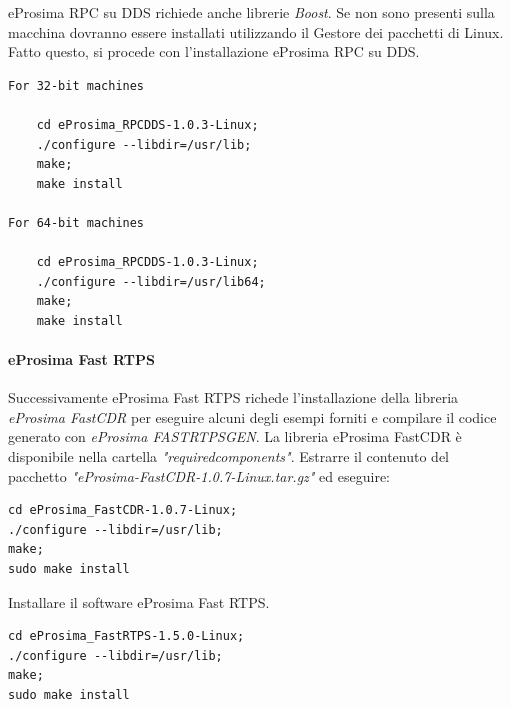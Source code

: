 \documentclass[a4paper]{article}
\begin{document}
eProsima RPC su DDS richiede anche librerie \textit{Boost}. Se non sono presenti sulla macchina dovranno essere installati utilizzando il  Gestore dei pacchetti di Linux. Fatto questo, si procede con l'installazione  eProsima RPC su DDS.

\begin{verbatim}
For 32-bit machines

    cd eProsima_RPCDDS-1.0.3-Linux;
    ./configure --libdir=/usr/lib;
    make;
    make install

For 64-bit machines

    cd eProsima_RPCDDS-1.0.3-Linux;
    ./configure --libdir=/usr/lib64;
    make;
    make install
\end{verbatim}

\paragraph{eProsima Fast RTPS}
Successivamente eProsima Fast RTPS richede l'installazione della libreria \textit{eProsima FastCDR} per eseguire alcuni degli esempi forniti e compilare il codice generato con \textit{eProsima FASTRTPSGEN}.
La libreria eProsima FastCDR è disponibile nella cartella \textit{"requiredcomponents"}. Estrarre il contenuto del pacchetto \textit{"eProsima-FastCDR-1.0.7-Linux.tar.gz"} ed eseguire:
\begin{verbatim}
cd eProsima_FastCDR-1.0.7-Linux;
./configure --libdir=/usr/lib;
make;
sudo make install
\end{verbatim}
Installare il software eProsima Fast RTPS.
\begin{verbatim}
cd eProsima_FastRTPS-1.5.0-Linux;
./configure --libdir=/usr/lib;
make;
sudo make install

\end{verbatim}
\end{document}
